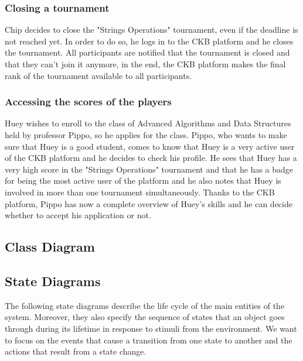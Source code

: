 \subsubsection{Closing a tournament}
Chip decides to close the "Strings Operations" tournament, even if the deadline is not reached yet.
In order to do so, he logs in to the CKB platform and he closes the tournament.
All participants are notified that the tournament is closed and that they can't join it anymore, in the end, the CKB platform makes the final rank of the tournament available to all participants.

\subsubsection{Accessing the scores of the players}
Huey wishes to enroll to the class of Advanced Algorithms and Data Structures held by professor Pippo, so he applies for the class.
Pippo, who wants to make sure that Huey is a good student, comes to know that Huey is a very active user of the CKB platform and he decides to check his profile.
He sees that Huey has a very high score in the "Strings Operations" tournament and that he has a badge for being the most active user of the platform and he also notes that Huey is involved in more than one tournament simultaneously.
Thanks to the CKB platform, Pippo has now a complete overview of Huey's skills and he can decide whether to accept his application or not.

\subsection{Class Diagram}

\subsection{State Diagrams}
The following state diagrams describe the life cycle of the main entities of the system.
Moreover, they also specify the sequence of states that an object goes through during its lifetime in response to stimuli from the environment.
We want to focus on the events that cause a transition from one state to another and the actions that result from a state change.

